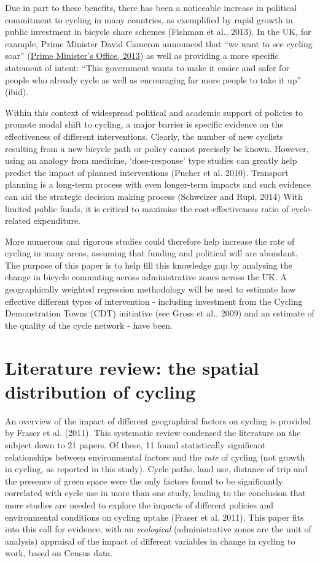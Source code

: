 Due in part to these benefits, there has been a noticeable increase in
political commitment to cycling in many countries, as exemplified by
rapid growth in public investment in bicycle share schemes (Fishman et
al., 2013). In the UK, for example, Prime Minister David Cameron
announced that ``we want to see cycling soar''
(\href{https://www.gov.uk/government/news/government-shifts-cycling-up-a-gear}{Prime
Minister's Office, 2013}) as well as providing a more specific statement
of intent: ``This government wants to make it easier and safer for
people who already cycle as well as encouraging far more people to take
it up'' (ibid).

Within this context of widespread political and academic support of
policies to promote modal shift to cycling, a major barrier is specific
evidence on the effectiveness of different interventions. Clearly, the
number of new cyclists resulting from a new bicycle path or policy
cannot precisely be known. However, using an analogy from medicine,
`dose-response' type studies can greatly help predict the impact of
planned interventions (Pucher et al. 2010). Transport planning is a
long-term process with even longer-term impacts and such evidence can
aid the strategic decision making process (Schweizer and Rupi, 2014)
With limited public funds, it is critical to maximise the
cost-effectiveness ratio of cycle-related expenditure.

More numerous and rigorous studies could therefore help increase the
rate of cycling in many areas, assuming that funding and political will
are abundant. The purpose of this paper is to help fill this knowledge
gap by analysing the change in bicycle commuting across administrative
zones across the UK. A geographically weighted regression methodology
will be used to estimate how effective different types of intervention -
including investment from the Cycling Demonstration Towns (CDT)
initiative (see Gross et al., 2009) and an estimate of the quality of
the cycle network - have been.

\section{Literature review: the spatial distribution of
cycling}\label{literature-review-the-spatial-distribution-of-cycling}

An overview of the impact of different geographical factors on cycling
is provided by Fraser et al. (2011). This systematic review condensed
the literature on the subject down to 21 papers. Of these, 11 found
statistically significant relationships between environmental factors
and the \emph{rate} of cycling (not growth in cycling, as reported in
this study). Cycle paths, land use, distance of trip and the presence of
green space were the only factors found to be significantly correlated
with cycle use in more than one study, leading to the conclusion that
more studies are needed to explore the impacts of different policies and
environmental conditions on cycling uptake (Fraser et al. 2011). This
paper fits into this call for evidence, with an \emph{ecological}
(administrative zones are the unit of analysis) appraisal of the impact
of different variables in change in cycling to work, based on Census
data.

